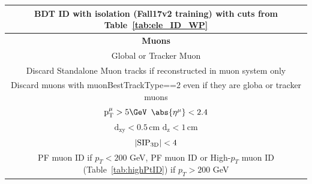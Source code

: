 \begin{table}[H]
\begin{tabular}{|c|c|}
                \multicolumn{2}{|c|}{BDT ID with isolation (Fall17v2 training) with cuts from Table~\ref{tab:ele_ID_WP} }    \\        
                \hline \hline
		\multicolumn{2}{|c|}{\textbf{Muons}}  \\ \hline
                \multicolumn{2}{|c|}{Global or Tracker Muon} \\
                \multicolumn{2}{|c|}{Discard Standalone Muon tracks if reconstructed in muon system only} \\
                \multicolumn{2}{|c|}{Discard muons with muonBestTrackType==2 even if they are globa or tracker muons} \\
		\multicolumn{2}{|c|}{$\mathrm{p_T^{\mu}} > 5 \GeV$ \hspace{0.5cm} $\abs{\eta^{\mu}} < 2.4$}                                                                                                                                       \\
		\multicolumn{2}{|c|}{$\mathrm{d_{xy}} < 0.5 \, \mathrm{cm}$ \hspace{0.5cm} $\mathrm{d_{z}} < 1 \, \mathrm{cm}$}                                                                                                                           \\
		\multicolumn{2}{|c|}{$| {\rm SIP_{3D}} | < 4$  }                                                                                                                                                                                   \\
		\multicolumn{2}{|c|}{PF muon ID if $p_T<200$  GeV, PF muon ID or High-$p_T$ muon ID (Table~\ref{tab:highPtID}) if $p_T>200$ GeV}                                                                                                                                                 \\

\end{tabular}
\end{table}
